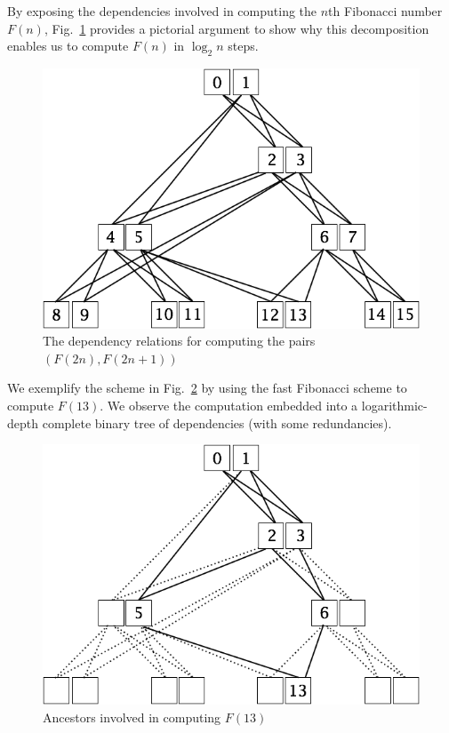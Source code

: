 By exposing the dependencies involved in computing the $n$th Fibonacci number $F(n)$,
Fig.~\ref{fig:fastFibo} provides a pictorial argument to show why this decomposition 
enables us to compute $F(n)$ in $\log_2 n$ steps.
\begin{figure}[h]
\begin{center}
        \includegraphics[scale=0.3]{FiguresMaths/FiboFast.png}
        \caption{The dependency relations for computing the pairs $(F(2n), F(2n+1))$}
                \label{fig:fastFibo}
\end{center}
\end{figure}

We exemplify the scheme in Fig.~\ref{fig:fastFibo13} by using the fast Fibonacci scheme to compute $F(13)$.  We observe the computation embedded into a logarithmic-depth 
complete binary tree of dependencies (with some redundancies).
\begin{figure}[h]
\begin{center}
        \includegraphics[scale=0.3]{FiguresMaths/FiboFast13.png}
        \caption{Ancestors involved in computing $F(13)$ }
        \label{fig:fastFibo13}
\end{center}
\end{figure}


